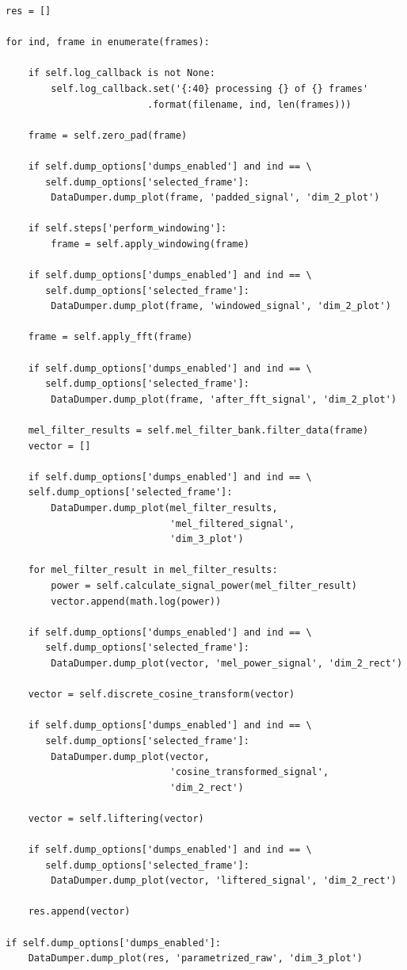\documentclass[magister]{dyplom}
\begin{document}
	\begingroup
	\begin{verbatim}
res = []

for ind, frame in enumerate(frames):

    if self.log_callback is not None:
        self.log_callback.set('{:40} processing {} of {} frames'
                         .format(filename, ind, len(frames)))
    
    frame = self.zero_pad(frame)

    if self.dump_options['dumps_enabled'] and ind == \
       self.dump_options['selected_frame']:
        DataDumper.dump_plot(frame, 'padded_signal', 'dim_2_plot')

    if self.steps['perform_windowing']:
        frame = self.apply_windowing(frame)

    if self.dump_options['dumps_enabled'] and ind == \
       self.dump_options['selected_frame']:
        DataDumper.dump_plot(frame, 'windowed_signal', 'dim_2_plot')

    frame = self.apply_fft(frame)

    if self.dump_options['dumps_enabled'] and ind == \
       self.dump_options['selected_frame']:
        DataDumper.dump_plot(frame, 'after_fft_signal', 'dim_2_plot')

    mel_filter_results = self.mel_filter_bank.filter_data(frame)
    vector = []

    if self.dump_options['dumps_enabled'] and ind == \
    self.dump_options['selected_frame']:
        DataDumper.dump_plot(mel_filter_results,
                             'mel_filtered_signal',
                             'dim_3_plot')

    for mel_filter_result in mel_filter_results:
        power = self.calculate_signal_power(mel_filter_result)
        vector.append(math.log(power))

    if self.dump_options['dumps_enabled'] and ind == \
       self.dump_options['selected_frame']:
        DataDumper.dump_plot(vector, 'mel_power_signal', 'dim_2_rect')

    vector = self.discrete_cosine_transform(vector)

    if self.dump_options['dumps_enabled'] and ind == \
       self.dump_options['selected_frame']:
        DataDumper.dump_plot(vector,
                             'cosine_transformed_signal',
                             'dim_2_rect')

    vector = self.liftering(vector)

    if self.dump_options['dumps_enabled'] and ind == \
       self.dump_options['selected_frame']:
        DataDumper.dump_plot(vector, 'liftered_signal', 'dim_2_rect')

    res.append(vector)

if self.dump_options['dumps_enabled']:
    DataDumper.dump_plot(res, 'parametrized_raw', 'dim_3_plot')
	\end{verbatim}
	\endgroup
	\vspace{1em}
		
\end{document}
